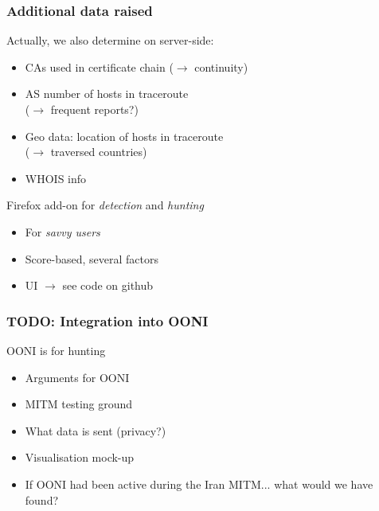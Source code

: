 \begin{frame}
\frametitle{Additional data raised}
\begin{block}{Actually, we also determine on server-side:}
  \begin{itemize}
    \item CAs used in certificate chain ($\rightarrow$ continuity)
    \item AS number of hosts in traceroute \\ ($\rightarrow$ frequent reports?)
    \item Geo data: location of hosts in traceroute \\ ($\rightarrow$ traversed countries)
    \item WHOIS info
  \end{itemize}
\end{block}
\begin{block}{Firefox add-on for \textit{detection} and \textit{hunting}}
  \begin{itemize}
    \item For \textit{savvy users}
    \item Score-based, several factors
    \item UI $\rightarrow$ see code on github
  \end{itemize}
\end{block}
\end{frame}


\begin{frame}
\frametitle{TODO: Integration into OONI}
\begin{block}{OONI is for hunting}
  \begin{itemize}
    \item Arguments for OONI
    \item MITM testing ground
    \item What data is sent (privacy?)
    \item Visualisation mock-up
    \item If OONI had been active during the Iran MITM... what would we have found?
  \end{itemize}
\end{block}
\end{frame}

